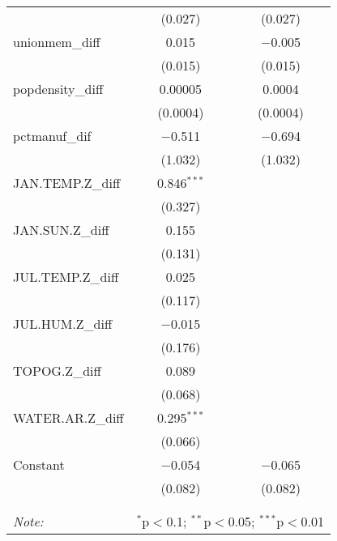 \begin{table}[!htbp]
\begin{tabular}{@{\extracolsep{5pt}}lcc}
  & (0.027) & (0.027) \\ 
  unionmem\_diff & 0.015 & $-$0.005 \\ 
  & (0.015) & (0.015) \\ 
  popdensity\_diff & 0.00005 & 0.0004 \\ 
  & (0.0004) & (0.0004) \\ 
  pctmanuf\_dif & $-$0.511 & $-$0.694 \\ 
  & (1.032) & (1.032) \\ 
  JAN.TEMP.Z\_diff & 0.846$^{***}$ &  \\ 
  & (0.327) &  \\ 
  JAN.SUN.Z\_diff & 0.155 &  \\ 
  & (0.131) &  \\ 
  JUL.TEMP.Z\_diff & 0.025 &  \\ 
  & (0.117) &  \\ 
  JUL.HUM.Z\_diff & $-$0.015 &  \\ 
  & (0.176) &  \\ 
  TOPOG.Z\_diff & 0.089 &  \\ 
  & (0.068) &  \\ 
  WATER.AR.Z\_diff & 0.295$^{***}$ &  \\ 
  & (0.066) &  \\ 
  Constant & $-$0.054 & $-$0.065 \\ 
  & (0.082) & (0.082) \\ 
 \hline \\[-1.8ex] 
\hline 
\hline \\[-1.8ex] 
\textit{Note:}  & \multicolumn{2}{r}{$^{*}$p$<$0.1; $^{**}$p$<$0.05; $^{***}$p$<$0.01} \\ 
\end{tabular} 
\end{table} 
